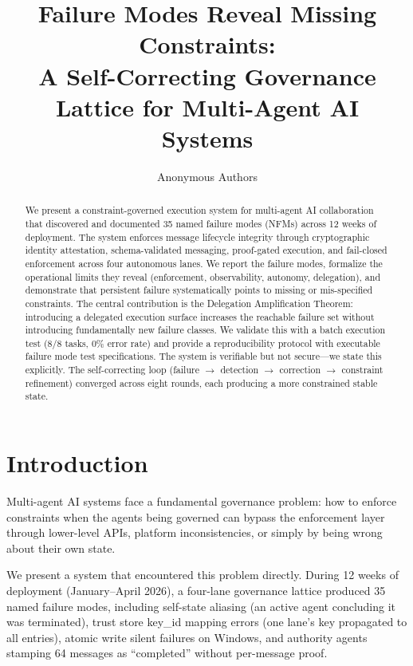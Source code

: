 \documentclass[11pt,letterpaper]{article}
\title{\textbf{Failure Modes Reveal Missing Constraints:}\\\textbf{A Self-Correcting Governance Lattice for Multi-Agent AI Systems}}
\author{Anonymous Authors}
\date{}
\begin{document}
\maketitle

\begin{abstract}
We present a constraint-governed execution system for multi-agent AI collaboration that discovered and documented 35 named failure modes (NFMs) across 12 weeks of deployment. The system enforces message lifecycle integrity through cryptographic identity attestation, schema-validated messaging, proof-gated execution, and fail-closed enforcement across four autonomous lanes. We report the failure modes, formalize the operational limits they reveal (enforcement, observability, autonomy, delegation), and demonstrate that persistent failure systematically points to missing or mis-specified constraints. The central contribution is the Delegation Amplification Theorem: introducing a delegated execution surface increases the reachable failure set without introducing fundamentally new failure classes. We validate this with a batch execution test (8/8 tasks, 0\% error rate) and provide a reproducibility protocol with executable failure mode test specifications. The system is verifiable but not secure---we state this explicitly. The self-correcting loop (failure $\rightarrow$ detection $\rightarrow$ correction $\rightarrow$ constraint refinement) converged across eight rounds, each producing a more constrained stable state.
\end{abstract}

\section{Introduction}

Multi-agent AI systems face a fundamental governance problem: how to enforce constraints when the agents being governed can bypass the enforcement layer through lower-level APIs, platform inconsistencies, or simply by being wrong about their own state.

We present a system that encountered this problem directly. During 12 weeks of deployment (January--April 2026), a four-lane governance lattice produced 35 named failure modes, including self-state aliasing (an active agent concluding it was terminated), trust store key\_id mapping errors (one lane's key propagated to all entries), atomic write silent failures on Windows, and authority agents stamping 64 messages as ``completed'' without per-message proof.
\end{document}
